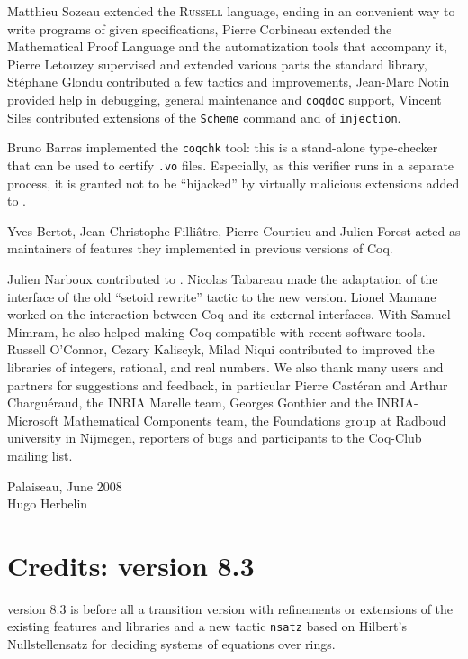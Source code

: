 Matthieu Sozeau extended the \textsc{Russell} language, ending in an
convenient way to write programs of given specifications, Pierre
Corbineau extended the Mathematical Proof Language and the
automatization tools that accompany it, Pierre Letouzey supervised and
extended various parts the standard library, Stéphane Glondu
contributed a few tactics and improvements, Jean-Marc Notin provided
help in debugging, general maintenance and {\tt coqdoc} support,
Vincent Siles contributed extensions of the {\tt Scheme} command and
of {\tt injection}.

Bruno Barras implemented the {\tt coqchk} tool: this is a stand-alone
type-checker that can be used to certify {\tt .vo} files. Especially,
as this verifier runs in a separate process, it is granted not to be
``hijacked'' by virtually malicious extensions added to {\Coq}.

Yves Bertot, Jean-Christophe Filliâtre, Pierre Courtieu and
Julien Forest acted as maintainers of features they implemented in
previous versions of Coq.

Julien Narboux contributed to {\CoqIDE}.
Nicolas Tabareau made the adaptation of the interface of the old
``setoid rewrite'' tactic to the new version. Lionel Mamane worked on
the interaction between Coq and its external interfaces. With Samuel
Mimram, he also helped making Coq compatible with recent software
tools.  Russell O'Connor, Cezary Kaliscyk, Milad Niqui contributed to
improved the libraries of integers, rational, and real numbers. We
also thank many users and partners for suggestions and feedback, in
particular Pierre Castéran and Arthur Charguéraud, the INRIA Marelle
team, Georges Gonthier and the INRIA-Microsoft Mathematical Components team, 
the Foundations group at Radboud university in Nijmegen, reporters of bugs
and participants to the Coq-Club mailing list.

\begin{flushright}
Palaiseau, June 2008\\
Hugo Herbelin\\
\end{flushright}

\section*{Credits: version 8.3}

{\Coq} version 8.3 is before all a transition version with refinements
or extensions of the existing features and libraries and a new tactic
{\tt nsatz} based on Hilbert's Nullstellensatz for deciding systems of
equations over rings.

